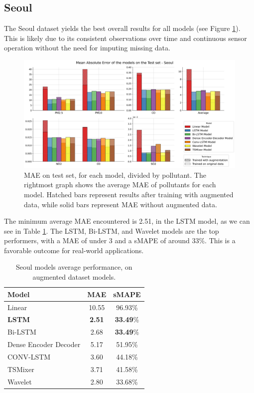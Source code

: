 \subsection{Seoul}

The Seoul dataset yields the best overall results for all models (see Figure \ref{fig:seoul_results}). This is likely due to its consistent observations over time and continuous sensor operation without the need for imputing missing data.

\begin{figure}[h]
    \centering
    \includegraphics[width=1\linewidth]{images/Seoul_results.png}
    \caption{MAE on test set, for each model, divided by pollutant. The rightmost graph shows the average MAE of pollutants for each model. Hatched bars represent results after training with augmented data, while solid bars represent MAE without augmented data.}
    \label{fig:seoul_results}
\end{figure}

The minimum average MAE encountered is 2.51, in the LSTM model, as we can see in Table \ref{tab:Seoul performance}.
The LSTM, Bi-LSTM, and Wavelet models are the top performers, with a MAE of under 3 and a sMAPE of around 33\%. This is a favorable outcome for real-world applications.

\begin{table}[h]
    \centering
    \begin{tabular}{lcc}
        \toprule
        \textbf{Model} & \textbf{MAE} & \textbf{sMAPE} \\ 
        \midrule
        Linear & 10.55 & 96.93\% \\
        \textbf{LSTM} & \textbf{2.51} & \textbf{33.49}\% \\
        Bi-LSTM & 2.68 & \textbf{33.49}\% \\
        Dense Encoder Decoder & 5.17 & 51.95\% \\
        CONV-LSTM & 3.60 & 44.18\% \\
        TSMixer & 3.71 & 41.58\% \\
        Wavelet & 2.80 & 33.68\% \\
        \bottomrule
    \end{tabular}
    \caption{Seoul models average performance, on augmented dataset models.}
    \label{tab:Seoul performance}
\end{table}

